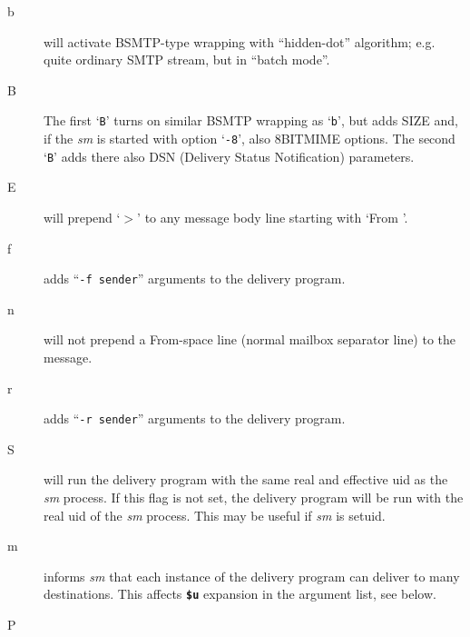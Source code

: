 \begin{description}
\item[b] \mbox{}

will activate BSMTP-type wrapping with ``hidden-dot''
algorithm; e.g. quite ordinary SMTP stream, but in
``batch mode''.



\item[B] \mbox{}

The first `{\tt B}' turns on similar BSMTP wrapping as
`{\tt b}', but adds SIZE and, if the {\em sm\/} is started with
option `{\tt -8}', also 8BITMIME options. The second `{\tt B}'
adds there also DSN (Delivery Status Notification)
parameters.



\item[E] \mbox{}

will prepend `{\(>\)}' to any message body line starting
with `From '.



\item[f] \mbox{}

adds ``{\tt -f sender}'' arguments to the delivery program.



\item[n] \mbox{}

will not prepend a From-space line (normal mailbox
separator line) to the message.



\item[r] \mbox{}

adds ``{\tt -r sender}'' arguments to the delivery program.



\item[S] \mbox{}

will run the delivery program with the same real
and effective uid as the {\em sm\/} process. If this flag
is not set, the delivery program will be run with
the real uid of the {\em sm\/} process. This may be useful
if {\em sm\/} is setuid.



\item[m] \mbox{}

informs {\em sm\/} that each instance of the delivery program 
can deliver to many destinations. This
affects {\bf {\tt \$u}} expansion in the argument list, see
below.



\item[P] \mbox{}


\end{description}

